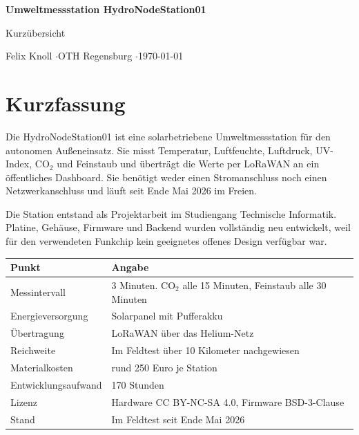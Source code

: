 \documentclass[11pt,a4paper]{scrartcl}
\begin{document}
\begin{center}
  {\LARGE\bfseries\color{accent} Umweltmessstation HydroNodeStation01\par}
  \vspace{0.4em}
  {\large Kurzübersicht\par}
  \vspace{0.6em}
  {\normalsize Felix Knoll \quad$\cdot$\quad OTH Regensburg \quad$\cdot$\quad \today\par}
\end{center}
\vspace{1em}

\section*{Kurzfassung}

Die HydroNodeStation01 ist eine solarbetriebene Umweltmessstation für den autonomen Außeneinsatz. Sie misst Temperatur, Luftfeuchte, Luftdruck, UV\hspace{0pt}-Index, CO$_2$ und Feinstaub und überträgt die Werte per LoRaWAN an ein öffentliches Dashboard. Sie benötigt weder einen Stromanschluss noch einen Netzwerkanschluss und läuft seit Ende Mai 2026 im Freien.

Die Station entstand als Projektarbeit im Studiengang Technische Informatik. Platine, Gehäuse, Firmware und Backend wurden vollständig neu entwickelt, weil für den verwendeten Funkchip kein geeignetes offenes Design verfügbar war.

\begin{table}[h]
  \centering
  \begin{tabularx}{\textwidth}{lL}
    \toprule
    \textbf{Punkt} & \textbf{Angabe} \\
    \midrule
    Messintervall     & 3 Minuten. CO$_2$ alle 15 Minuten, Feinstaub alle 30 Minuten \\
    Energieversorgung & Solarpanel mit Pufferakku \\
    Übertragung       & LoRaWAN über das Helium\hspace{0pt}-Netz \\
    Reichweite        & Im Feldtest über 10 Kilometer nachgewiesen \\
    Materialkosten    & rund 250 Euro je Station \\
    Entwicklungsaufwand & 170 Stunden \\
    Lizenz            & Hardware CC BY\hspace{0pt}-NC\hspace{0pt}-SA 4.0, Firmware BSD\hspace{0pt}-3\hspace{0pt}-Clause \\
    Stand             & Im Feldtest seit Ende Mai 2026 \\
    \bottomrule
  \end{tabularx}
\end{table}
\end{document}
